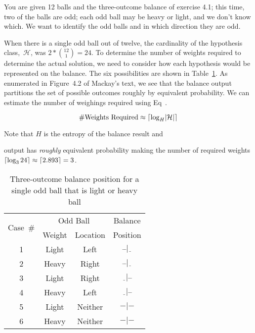 \begin{problem}{4}{14}
  You are given 12 balls and the three-outcome balance of exercise 4.1; this time, two of the balls are odd; each odd ball may be heavy or light, and we don't know which.  We want to identify the odd balls and in which direction they are odd.
\end{problem}

  When there is a single odd ball out of twelve, the cardinality of the hypothesis class,~$\mathcal{H}$, was ${2 * \binom{12}{1} = 24}$.  To determine the number of weights required to determine the actual solution, we need to consider how each hypothesis would be represented on the balance.  The six possibilities are shown in Table~\ref{tab:p1OneBallTable}.  As enumerated in Figure~4.2 of Mackay's text, we see that the balance output partitions the set of possible outcomes roughly by equivalent probability. We can estimate the number of weighings required using Eq~.
  
  \begin{equation}\label{eq:p1NumbWeightsRequired}
    \#\text{Weights Required} \approx \lceil \log_{H} \lvert\mathcal{H}\rvert  \rceil
  \end{equation}
  
  \noindent
  Note that $H$ is the entropy of the balance result and 
  
   output has \textit{roughly} equivalent probability making the number of required weights ${\lceil \log_{3} 24 \rceil \approx \lceil 2.893 \rceil = 3}$.

  \begin{table}[H]
    \centering
    \caption{Three-outcome balance position for a \\single odd ball that is light or heavy ball}\label{tab:p1OneBallTable}
    \begin{tabular}{|c||c|c||c|}
      \hline
      \multirow{2}{*}{Case~\#} &  \multicolumn{2}{c||}{Odd Ball} & Balance\\\cline{2-3}
      &  Weight  &  Location &  Position  \\ \hline\hline
      1   &  Light   &  Left     &  $\bar{~}\bar{~}|\underline{~~}$ \\ \hline
      2   &  Heavy   &  Right    &  $\bar{~}\bar{~}|\underline{~~}$ \\ \hline\hline
      3   &  Light   &  Right    &  $\underline{~~}|\bar{~}\bar{~}$ \\ \hline
      4   &  Heavy   &  Left     &  $\underline{~~}|\bar{~}\bar{~}$ \\ \hline\hline
      5   &  Light   &  Neither  &  $-|-$ \\ \hline
      6   &  Heavy   &  Neither  &  $-|-$ \\ \hline
    \end{tabular}
  \end{table}


